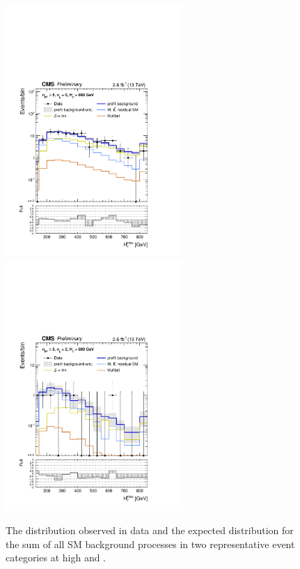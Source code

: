\begin{figure}[tbhp]
  \begin{center}
    \includegraphics[width=0.6\textwidth]{mhtShape_eq0b_ge5j_800_Inf_prefit.pdf} 
    \includegraphics[width=0.6\textwidth]{mhtShape_eq2b_ge5j_800_Inf_prefit.pdf} \\
  \end{center}
  \caption{ The \mht distribution observed in data and the expected
    distribution for the sum of all SM background processes in two
    representative event categories at high \njet and \scalht. 
    \label{fig:mht-templates} }
\end{figure}
